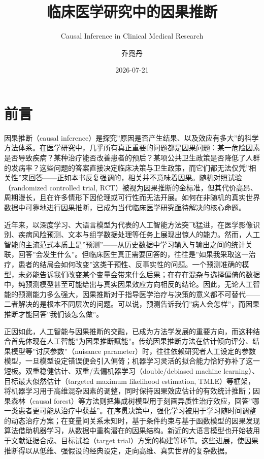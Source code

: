 \documentclass[
  chinese-hans,
  letterpaper,
  DIV=11,
  numbers=noendperiod]{scrreprt}
\title{临床医学研究中的因果推断}
\subtitle{Causal Inference in Clinical Medical Research}
\author{乔霓丹}
\date{2026-07-21}
\renewcommand*\contentsname{目录}
\newcommand\contentsname{目录}
\begin{document}
\maketitle

\renewcommand*\contentsname{目录}
{
\setcounter{tocdepth}{2}
\tableofcontents
}


\chapter*{前言}\label{ux524dux8a00}


因果推断（causal
inference）是探究''原因是否产生结果、以及效应有多大''的科学方法体系。在医学研究中，几乎所有真正重要的问题都是因果问题：某一危险因素是否导致疾病？某种治疗能否改善患者的预后？某项公共卫生政策是否降低了人群的发病率？这些问题的答案直接决定临床决策与卫生政策，而它们都无法仅凭''相关性''来回答------正如本书反复强调的，相关并不意味着因果。随机对照试验（randomized
controlled trial,
RCT）被视为因果推断的金标准，但其代价高昂、周期漫长，且在许多情形下因伦理或可行性而无法开展。如何在非随机的真实世界数据中可靠地进行因果推断，已成为当代临床医学研究亟待解决的核心命题。

近年来，以深度学习、大语言模型为代表的人工智能方法突飞猛进，在医学影像识别、疾病风险预测、文本与组学数据处理等任务上展现出惊人的能力。然而，人工智能的主流范式本质上是''预测''------从历史数据中学习输入与输出之间的统计关联，回答''会发生什么''。但临床医生真正需要回答的，往往是''如果我采取这一治疗，患者的结局会如何改变''这类干预性、反事实性的问题。一个预测准确的模型，未必能告诉我们改变某个变量会带来什么后果；在存在混杂与选择偏倚的数据中，纯预测模型甚至可能给出与真实因果效应方向相反的结论。因此，无论人工智能的预测能力多么强大，因果推断对于指导医学治疗与决策的意义都不可替代------二者解决的是根本不同层次的问题。可以说，预测告诉我们''病人会怎样''，而因果推断才能回答''我们该怎么做''。

正因如此，人工智能与因果推断的交融，已成为方法学发展的重要方向，而这种结合首先体现在人工智能''为因果推断赋能''。传统因果推断方法在估计倾向评分、结果模型等''讨厌参数''（nuisance
parameter）时，往往依赖研究者人工设定的参数模型，一旦模型设定错误便会引入偏倚；机器学习灵活的拟合能力恰好弥补了这一短板。双重稳健估计、双重/去偏机器学习（double/debiased
machine learning）、目标最大似然估计（targeted maximum likelihood
estimation,
TMLE）等框架，将机器学习用于高维混杂因素的调整，同时保持因果效应估计的有效统计推断；因果森林（causal
forest）等方法则把集成树模型用于刻画异质性治疗效应，回答''哪一类患者更可能从治疗中获益''。在序贯决策中，强化学习被用于学习随时间调整的动态治疗方案；在变量间关系未知时，基于条件约束与基于函数模型的因果发现算法借助机器学习，从数据中重构潜在的因果结构。新近的大语言模型也开始被用于文献证据合成、目标试验（target
trial）方案的构建等环节。这些进展，使因果推断得以从低维、强假设的经典设定，走向高维、真实世界的复杂数据。
\end{document}

